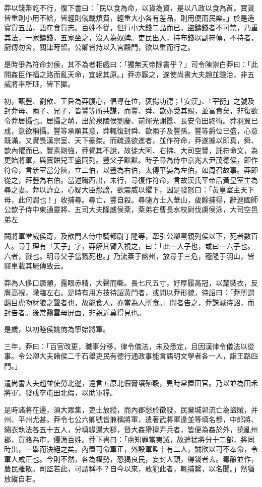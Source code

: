 \begin{pinyinscope}
莽以錢幣訖不行，復下書曰：「民以食為命，以貨為資，是以八政以食為首。寶貨皆重則小用不給，皆輕則僦載煩費，輕重大小各有差品，則用便而民樂。」於是造寶貨五品，語在食貨志。百姓不從，但行小大錢二品而已。盜鑄錢者不可禁，乃重其法，一家鑄錢，五家坐之，沒入為奴婢。吏民出入，持布錢以副符傳，不持者，廚傳勿舍，關津苛留。公卿皆持以入宮殿門，欲以重而行之。

是時爭為符命封侯，其不為者相戲曰：「獨無天帝除書乎？」司令陳崇白莽曰：「此開姦臣作福之路而亂天命，宜絕其原。」莽亦厭之，遂使尚書大夫趙並驗治，非五威將率所班，皆下獄。

初，甄豐、劉歆、王舜為莽腹心，倡導在位，褒揚功德；「安漢」、「宰衡」之號及封莽母、兩子、兄子，皆豐等所共謀，而豐、舜、歆亦受其賜，並富貴矣，非復欲令莽居攝也。居攝之萌，出於泉陵侯劉慶、前煇光謝囂、長安令田終術。莽羽翼已成，意欲稱攝。豐等承順其意，莽輒復封舜、歆兩子及豐孫。豐等爵位已盛，心意既滿，又實畏漢宗室、天下豪桀。而疏遠欲進者，並作符命，莽遂據以即真，舜、歆內懼而已。豐素剛強，莽覺其不說，故徙大阿、右拂、大司空豐，託符命文，為更始將軍，與賣餅兒王盛同列。豐父子默默。時子尋為侍中京兆大尹茂德侯，即作符命，言新室當分陝，立二伯，以豐為右伯，太傅平晏為左伯，如周召故事。莽即從之，拜豐為右伯。當述職西出，未行，尋復作符命，言故漢氏平帝后黃皇室主為尋之妻。莽以詐立，心疑大臣怨謗，欲震威以懼下，因是發怒曰：「黃皇室主天下母，此何謂也！」收捕尋。尋亡，豐自殺。尋隨方士入華山，歲餘捕得，辭連國師公歆子侍中東通靈將、五司大夫隆威侯棻，棻弟右曹長水校尉伐虜侯泳，大司空邑弟左

闕將軍堂威侯奇，及歆門人侍中騎都尉丁隆等，牽引公卿黨親列侯以下，死者數百人。尋手理有「天子」字，莽解其臂入視之，曰：「此一大子也，或曰一六子也。六者，戮也。明尋父子當戮死也。」乃流棻于幽州，放尋于三危，殛隆于羽山，皆驛車載其屍傳致云。

莽為人侈口蹶顄，露眼赤精，大聲而嘶。長七尺五寸，好厚履高冠，以氂裝衣，反膺高視，瞰臨左右。是時有用方技待詔黃門者，或問以莽形貌，待詔曰：「莽所謂鴟目虎吻豺狼之聲者也，故能食人，亦當為人所食。」問者告之，莽誅滅待詔，而封告者。後常翳雲母屏面，非親近莫得見也。

是歲，以初睦侯姚恂為寧始將軍。

三年，莽曰：「百官改更，職事分移，律令儀法，未及悉定，且因漢律令儀法以從事。令公卿大夫諸侯二千石舉吏民有德行通政事能言語明文學者各一人，詣王路四門。」

遣尚書大夫趙並使勞北邊，還言五原北假膏壤殖穀，異時常置田官。乃以並為田禾將軍，發戍卒屯田北假，以助軍糧。

是時諸將在邊，須大眾集，吏士放縱，而內郡愁於徵發，民棄城郭流亡為盜賊，并州、平州尤甚。莽令七公六卿號皆兼稱將軍，遣著武將軍逯並等填名都，中郎將、繡衣執法各五十五人，分填緣邊大郡，督大姦猾擅弄兵者，皆便為姦於外，撓亂州郡，貨賂為市，侵漁百姓。莽下書曰：「虜知罪當夷滅，故遣猛將分十二部，將同時出，一舉而決絕之矣。內置司命軍正，外設軍監十有二人，誠欲以司不奉命，令軍人咸正也。今則不然，各為權勢，恐猲良民，妄封人頸，得錢者去。毒酿並作，農民離散。司監若此，可謂稱不？自今以來，敢犯此者，輒捕繫，以名聞。」然猶放縱自若。


\end{pinyinscope}
